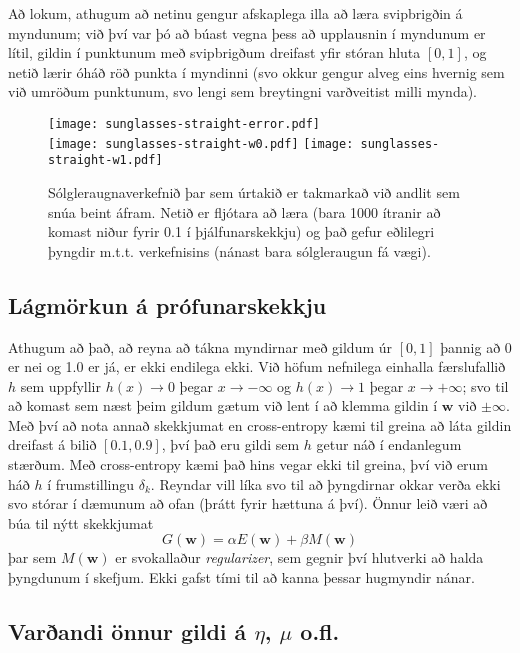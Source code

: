 \documentclass[a4paper,icelandic]{article}
\begin{document}
Að lokum, athugum að netinu gengur afskaplega illa að læra svipbrigðin á
myndunum; við því var þó að búast vegna þess að upplausnin í myndunum er
lítil, gildin í punktunum með svipbrigðum dreifast yfir stóran hluta
$[0,1]$, og netið lærir óháð röð punkta í myndinni (svo okkur gengur
alveg eins hvernig sem við umröðum punktunum, svo lengi sem breytingni
varðveitist milli mynda).

\begin{figure}[h!]
  \begin{center}
    \texttt{[image: sunglasses-straight-error.pdf]}
    \\
    \texttt{[image: sunglasses-straight-w0.pdf]}
    \texttt{[image: sunglasses-straight-w1.pdf]}
  \end{center}
  \caption{Sólgleraugnaverkefnið þar sem úrtakið er takmarkað við andlit
  sem snúa beint áfram. Netið er fljótara að læra (bara 1000 ítranir að
  komast niður fyrir 0.1 í þjálfunarskekkju) og það gefur eðlilegri þyngdir
  m.t.t. verkefnisins (nánast bara sólgleraugun fá vægi). }
  \label{fig:sunglasses-straight}
\end{figure}

\subsection{Lágmörkun á prófunarskekkju}

Athugum að það, að reyna að tákna myndirnar með gildum úr $[0,1]$
þannig að 0 er nei og 1.0 er já, er ekki endilega ekki. Við höfum
nefnilega einhalla færslufallið $h$ sem uppfyllir $h(x)\to 0$ þegar
$x\to -\infty$ og $h(x)\to 1$ þegar $x\to+\infty$; svo til að komast sem
næst þeim gildum gætum við lent í að klemma gildin í $\mathbf w$ við
$\pm\infty$. Með því að nota annað skekkjumat en cross-entropy kæmi til
greina að láta gildin dreifast á bilið $[0.1,0.9]$, því það eru gildi
sem $h$ getur náð í endanlegum stærðum. Með cross-entropy kæmi það hins
vegar ekki til greina, því við erum háð $h$ í frumstillingu $\delta_k$.
Reyndar vill líka svo til að þyngdirnar okkar verða ekki svo stórar í
dæmunum að ofan (þrátt fyrir hættuna á því). Önnur leið væri að búa til
nýtt skekkjumat 
\[ 
G(\mathbf w ) = \alpha E(\mathbf w) + \beta M(\mathbf w)
\]
þar sem $M(\mathbf w)$ er svokallaður \emph{regularizer}, sem gegnir því
hlutverki að halda þyngdunum í skefjum. Ekki gafst tími til að kanna
þessar hugmyndir nánar.

\subsection{Varðandi önnur gildi á $\eta$, $\mu$ o.fl.}
\end{document}

